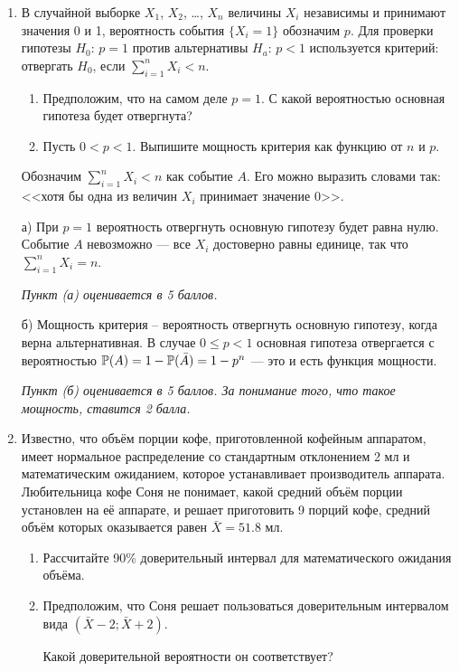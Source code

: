 \documentclass[pdftex,12pt,a4paper]{article}
\begin{document}
\begin{enumerate}
\vspace{6pt}

\item  В случайной выборке $X_1$, $X_2$, \ldots, $X_n$ величины $X_i$ независимы и принимают значения 0 и 1, вероятность события $\{X_i=1\}$ обозначим $p$. Для проверки гипотезы $H_0$: $p=1$  против альтернативы $H_a$: $p<1$ используется критерий: отвергать $H_0$, если $\sum_{i=1}^n X_i < n$.
\begin{enumerate}
\item Предположим, что на самом деле $p=1$. С какой вероятностью основная гипотеза будет отвергнута?
\item Пусть $0<p<1$. Выпишите мощность критерия как функцию от $n$ и $p$.
\end{enumerate}

\solution


Обозначим $\sum_{i=1}^n X_i < n$ как событие $A$. Его можно выразить словами так: <<хотя бы одна из величин $X_i$ принимает значение 0>>. 

а) При $p=1$ вероятность отвергнуть основную гипотезу будет равна нулю. Событие $A$ невозможно --- все $X_i$ достоверно равны единице, так что $\sum_{i=1}^n X_i = n$.

\textit{Пункт (а) оценивается в 5 баллов.}

б) Мощность критерия – вероятность отвергнуть основную гипотезу, когда верна альтернативная. В случае $0 \leq p <1$ основная гипотеза отвергается с вероятностью $\P(A)=1-\P(\bar{A})=1-p^n$  --- это и есть функция мощности.

\textit{Пункт (б) оценивается в 5 баллов. За понимание того, что такое мощность, ставится 2  балла.}

\item Известно, что объём порции кофе, приготовленной кофейным аппаратом, имеет нормальное распределение со стандартным отклонением 2 мл и математическим ожиданием, которое устанавливает производитель аппарата. Любительница кофе Соня не понимает, какой средний объём порции установлен на её аппарате, и решает приготовить 9 порций кофе, средний объём которых оказывается равен $\bar{X}=51.8$ мл.
\begin{enumerate}
\item Рассчитайте 90\% доверительный интервал для математического ожидания объёма.
\item  Предположим, что Соня решает пользоваться доверительным интервалом вида $(\bar{X}-2;\bar{X}+2)$. 

Какой доверительной вероятности он соответствует?
\end{enumerate}


\end{enumerate}
\end{document}
